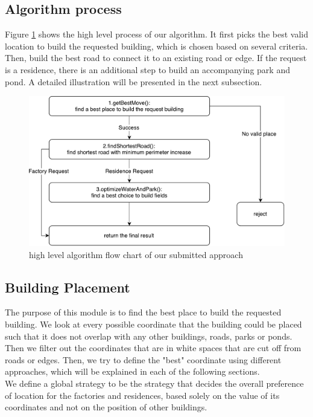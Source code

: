 \subsection{Algorithm process}
Figure \ref{fig:pentos} shows the high level process of our algorithm. It first picks the best valid location to build the requested building, which is chosen based on several criteria. Then, build the best road to connect it to an existing road or edge. If the request is a residence, there is an additional step to build an accompanying park and pond. A detailed illustration will be presented in the next subsection.

\begin{figure}
\center
\includegraphics[scale=0.5]{pentos.pdf}
\caption{high level algorithm flow chart of our submitted approach}
\label{fig:pentos}
\end{figure}

\subsection{Building Placement}
The purpose of this module is to find the best place to build the requested building. We look at every possible coordinate that the building could be placed such that it does not overlap with any other buildings, roads, parks or ponds. Then we filter out the coordinates that are in white spaces that are cut off from roads or edges. Then, we try to define the "best" coordinate using different approaches, which will be explained in each of the following sections. \\
We define a global strategy to be the strategy that decides the overall preference of location for the factories and residences, based solely on the value of its coordinates and not on the position of other buildings.
